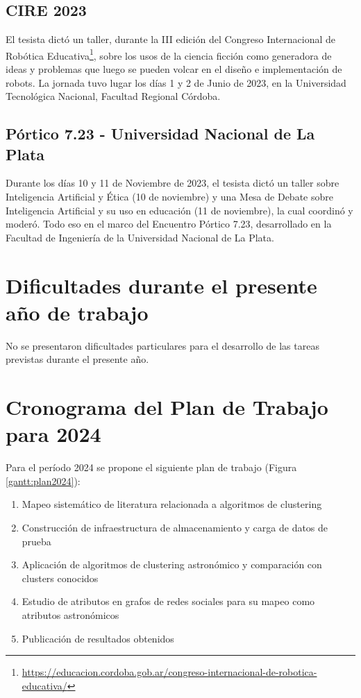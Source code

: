 \documentclass[
	11pt,oneside,a4paper,
	fleqn,
	article
]{memoir}
\begin{document}
\subsection{CIRE 2023}

El tesista dictó un taller, durante la III edición del Congreso Internacional de Robótica Educativa\footnote{\href{https://educacion.cordoba.gob.ar/congreso-internacional-de-robotica-educativa/}{https://educacion.cordoba.gob.ar/congreso-internacional-de-robotica-educativa/}}, sobre los usos de la ciencia ficción como generadora de ideas y problemas que luego se pueden volcar en el diseño e implementación de robots. La jornada tuvo lugar los días 1 y 2 de Junio de 2023, en la Universidad Tecnológica Nacional, Facultad Regional Córdoba.

\subsection{Pórtico 7.23 - Universidad Nacional de La Plata}

Durante los días 10 y 11 de Noviembre de 2023, el tesista dictó un taller sobre Inteligencia Artificial y Ética (10 de noviembre) y una Mesa de Debate sobre Inteligencia Artificial y su uso en educación (11 de noviembre), la cual coordinó y moderó. Todo eso en el marco del Encuentro Pórtico 7.23, desarrollado en la Facultad de Ingeniería de la Universidad Nacional de La Plata.


\section {Dificultades durante el presente año de trabajo}

No se presentaron dificultades particulares para el desarrollo de las tareas previstas durante el presente año.

\section {Cronograma del Plan de Trabajo para 2024}

Para el período 2024 se propone el siguiente plan de trabajo (Figura \ref{gantt:plan2024}):

\begin{enumerate}
	\item Mapeo sistemático de literatura relacionada a algoritmos de clustering
	\item Construcción de infraestructura de almacenamiento y carga de datos de prueba
	\item Aplicación de algoritmos de clustering astronómico y comparación con clusters conocidos
	\item Estudio de atributos en grafos de redes sociales para su mapeo como atributos astronómicos
	\item Publicación de resultados obtenidos
\end{enumerate}
\end{document}
